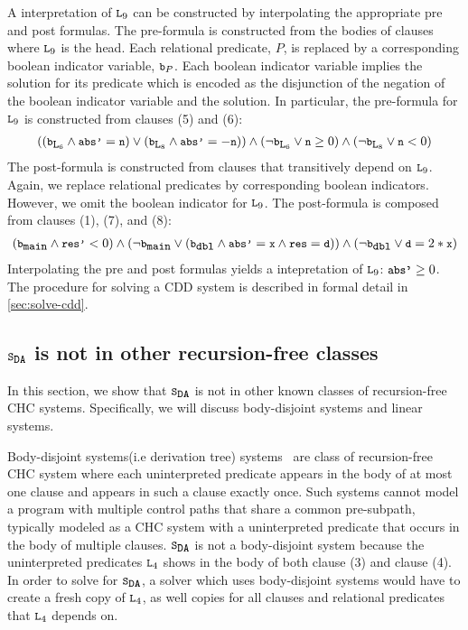 %
A interpretation of $\cc{L}_9$ can be constructed by interpolating
the appropriate pre and post formulas.
%
The pre-formula is constructed from the bodies of clauses where
$\cc{L}_9$ is the head. 
%
Each relational predicate, $P$,
is replaced by a corresponding boolean indicator variable, $\cc{b}_P$.
%
Each
boolean indicator variable implies the solution for its predicate which is encoded
as the disjunction of the negation of the boolean indicator variable and the solution.
%
In particular, the pre-formula for $\cc{L}_9$ is constructed from
clauses (5) and (6):
\begin{gather}
  ((\cc{b}_{\cc{L}_6} \land \cc{abs'} = \cc{n})
  \lor
  (\cc{b}_{\cc{L}_8} \land \cc{abs'} = -\cc{n}))
  \land
  (\neg \cc{b}_{\cc{L}_6} \lor \cc{n} \ge 0)
  \land
  (\neg \cc{b}_{\cc{L}_8} \lor \cc{n} < 0)
\end{gather}
%
The post-formula is constructed from clauses that transitively depend
on $\cc{L}_9$. Again, we replace relational predicates by
corresponding boolean indicators. However, we omit the boolean indicator for
$\cc{L}_9$. The post-formula is composed from clauses (1), (7), and
(8):
\begin{gather}
  (\cc{b}_{\cc{main}} \land \cc{res'} < 0)
  \land
  (\neg \cc{b}_{\cc{main}} \lor
    (\cc{b}_{\cc{dbl}}
    \land \cc{abs'}= \cc{x}
    \land \cc{res}=\cc{d} ))
  \land (\neg \cc{b}_{\cc{dbl}} \lor \cc{d} = 2*\cc{x})
\end{gather}
%
Interpolating the pre and post formulas yields a intepretation
of $\cc{L}_9$: $\cc{abs'} \geq 0$.
%
The procedure for solving a CDD system is described in formal detail
in \autoref{sec:solve-cdd}.

\subsection{$\mcchc$ is not in other recursion-free classes}
\label{sec:not-in}
%
In this section, we show that $\mcchc$ is not in other
known classes of recursion-free CHC systems. 
%
Specifically, we will
discuss body-disjoint systems and linear systems.
%

Body-disjoint systems(i.e derivation tree)
systems~\cite{mcmillan14,bjorner13,heizmann10,rummer13a,rummer13b} are
class of recursion-free CHC system where each uninterpreted predicate
appears in the body of at most one clause and appears in such a
clause exactly once.
%
Such systems cannot model a program with multiple control paths that
share a common pre-subpath, typically modeled as a CHC system with a
uninterpreted predicate that occurs in the body of multiple clauses.
%
$\mcchc$ is not a body-disjoint system because the uninterpreted
predicates $\cc{L}_4$ shows in the body of both clause (3) and clause
(4).
%
In order to solve for $\mcchc$, a solver which uses
body-disjoint systems would have to create a fresh copy of
$\cc{L}_4$, as well copies for all clauses and relational predicates that
$\cc{L}_4$ depends on.

